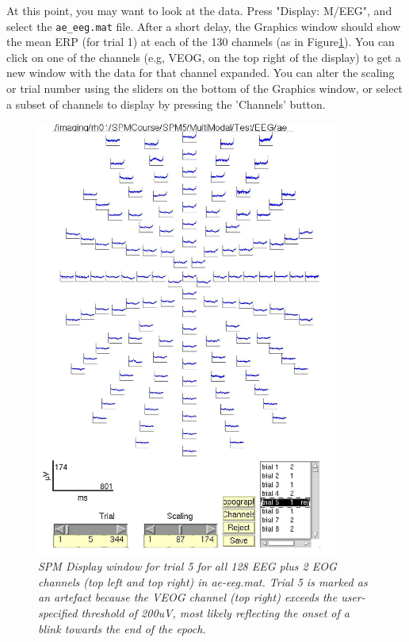 At this point, you may want to look at the data. Press "Display: M/EEG", and select the \verb!ae_eeg.mat! file. After a short delay, the Graphics window should show the mean ERP (for trial 1) at each of the 130 channels (as in Figure\ref{fig_32_2}). You can click on one of the channels (e.g, VEOG, on the top right of the display) to get a new window with the data for that channel expanded. You can alter the scaling or trial number using the sliders on the bottom of the Graphics window, or select a subset of channels to display by pressing the 'Channels' button.

\begin{figure}
\begin{center}
\includegraphics[width=100mm]{multimodal/figures/figure_32_2}
\caption{\em  SPM Display window for trial 5 for all 128 EEG plus 2 EOG channels (top left and top right) in ae-eeg.mat. Trial 5 is marked as an artefact because the VEOG channel (top right) exceeds the user-specified threshold of 200uV, most likely reflecting the onset of a blink towards the end of the epoch. \label{fig_32_2}}
\end{center}
\end{figure}



